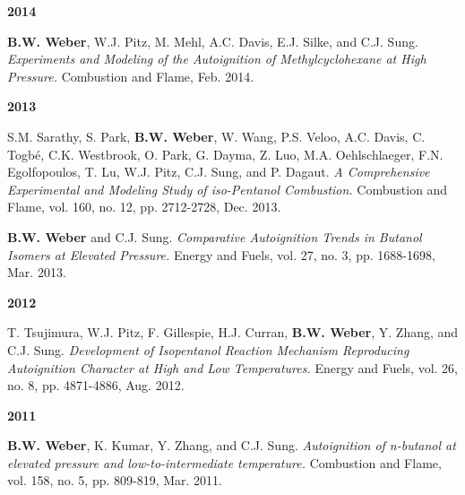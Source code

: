 \begin{bibsection}
\item[] \textbf{2014}
\item[] \textbf{B.W. Weber}, W.J. Pitz, M. Mehl, A.C. Davis,
        E.J. Silke, and C.J. Sung. \textit{Experiments and
        Modeling of the Autoignition of Methylcyclohexane at High
        Pressure.} Combustion and Flame, Feb. 2014.

\item[] \textbf{2013}
\item[] S.M. Sarathy, S. Park, \textbf{B.W. Weber}, W. Wang,
        P.S. Veloo, A.C. Davis, C. Togbé, C.K. Westbrook, O. Park,
        G. Dayma, Z. Luo, M.A. Oehlschlaeger, F.N. Egolfopoulos,
        T. Lu, W.J. Pitz, C.J. Sung, and P. Dagaut. \textit{A
        Comprehensive Experimental and Modeling Study of iso-Pentanol
        Combustion.} Combustion and Flame, vol. 160, no. 12, pp.
        2712-2728, Dec. 2013. 

\item[] \textbf{B.W. Weber} and C.J. Sung. \textit{Comparative
        Autoignition Trends in Butanol Isomers at Elevated Pressure.}
        Energy and Fuels, vol. 27, no. 3, pp. 1688-1698, Mar. 2013. \\

\item[] \textbf{2012}
\item[] T. Tsujimura, W.J. Pitz, F. Gillespie, H.J. Curran,
        \textbf{B.W. Weber}, Y. Zhang, and C.J. Sung.
        \textit{Development of Isopentanol Reaction Mechanism
        Reproducing Autoignition Character at High and Low
        Temperatures.} Energy and Fuels, vol. 26, no. 8, pp. 4871-4886,
        Aug. 2012. 

\item[] \textbf{2011}
\item[] \textbf{B.W. Weber}, K. Kumar, Y. Zhang, and C.J. Sung.
        \textit{Autoignition of n-butanol at elevated pressure and
        low-to-intermediate temperature.} Combustion and Flame,
        vol. 158, no. 5, pp. 809-819, Mar. 2011.
\end{bibsection}


